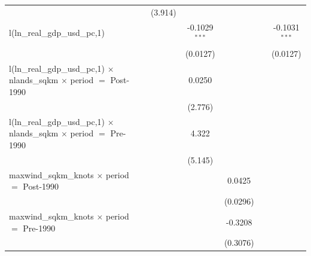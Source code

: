 \begin{tabular}{lcccccc}
                                                                                          &             & (3.914)                 &                 &          &                         &   \\   
   l(ln\_real\_gdp\_usd\_pc,1)                                                            &             &                         & -0.1029$^{***}$ &          &                         & -0.1031$^{***}$\\   
                                                                                          &             &                         & (0.0127)        &          &                         & (0.0127)\\   
   l(ln\_real\_gdp\_usd\_pc,1) $\times$ nlands\_sqkm $\times$ period $=$ Post-1990        &             &                         & 0.0250          &          &                         &   \\   
                                                                                          &             &                         & (2.776)         &          &                         &   \\   
   l(ln\_real\_gdp\_usd\_pc,1) $\times$ nlands\_sqkm $\times$ period $=$ Pre-1990         &             &                         & 4.322           &          &                         &   \\   
                                                                                          &             &                         & (5.145)         &          &                         &   \\   
   maxwind\_sqkm\_knots $\times$ period $=$ Post-1990                                     &             &                         &                 & 0.0425   &                         &   \\   
                                                                                          &             &                         &                 & (0.0296) &                         &   \\   
   maxwind\_sqkm\_knots $\times$ period $=$ Pre-1990                                      &             &                         &                 & -0.3208  &                         &   \\   
                                                                                          &             &                         &                 & (0.3076) &                         &   \\   

\end{tabular}

